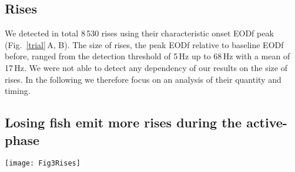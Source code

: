 \documentclass[vruler,JEB]{COB}%
\newcommand{\figitem}[1]{\textsf{\bfseries\uppercase{#1}}\penalty10000 }
\newcommand{\panel}[1]{\textsf{#1}}
\newcommand{\subfref}[2]{\textup{\ref{#1}}\,\panel{#2}}
\newcommand{\Figb}{Fig.}
\newcommand{\Subfigrefb}[2]{\Figb~\subfref{#1}{#2}}
\begin{document}
\subsection{Rises}

We detected in total 8\,530 rises using their characteristic onset EODf peak (\Subfigrefb{trial}{A, B}). The size of rises, the peak EODf relative to baseline EODf before, ranged from the detection threshold of 5\,Hz up to 68\,Hz with a mean of 17\,Hz. We were not able to detect any dependency of our results on the size of rises. In the following we therefore focus on an analysis of their quantity and timing.

\subsection{Losing fish emit more rises during the active-phase}

\begin{figure*}[!h]
\centerline{\texttt{[image: Fig3Rises]}}
\caption{Rise rates of winners and losers. \figitem{A} Rises were predominantly produced by losers of competitions during the dark-phase (shaded). Winners during the dark-phase produced equally little rises as both winners and losers during the light-phase (white background). \figitem{B} Losers of competitions reliably produced more rises than winners in the dark, although absolute and relative numbers of rises varied considerably between trials. \figitem{C} Time resolved discrimination performance between winners and losers based on differences in cumulative rise counts for the first 30\,min of the trials. The AUC of ROC analysis asymptotes to almost 100\,\% after about 25\,min, indicating the outcome of the trials to be already determined the latest from this time on. For comparison, the dashed line at 94\,\% indicates the performance of the GLM including all physical characteristics of the fish from \Subfigrefb{glm}{C}. \figitem{D} Time course of loser rise rates during the dark-phase. Rise rates of each trial (gray) were normalized to their mean rate. On average (black) rise rates reached a constant level after about 30\,min. \figitem{E} Fraction of rises of losing fish quantified in 15\,min time windows is consistently larger than 50\,\% (dashed line) throughout the whole dark period. Individual trials in gray, average over trials in black.}
\label{EODfriserates}
\end{figure*}
\end{document}
